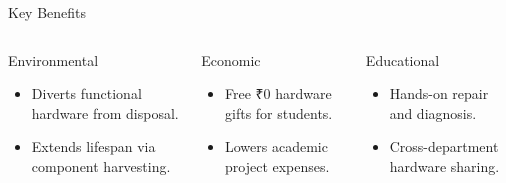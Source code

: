 \documentclass{beamer}
\begin{document}

\begin{frame}{Key Benefits}

\begin{columns}[T]

\begin{block}{Environmental}
\small
\begin{itemize}
    \item Diverts functional hardware from disposal.
    \item Extends lifespan via component harvesting.
\end{itemize}
\end{block}

\begin{block}{Economic}
\small
\begin{itemize}
    \item Free ₹0 hardware gifts for students.
    \item Lowers academic project expenses.
\end{itemize}
\end{block}

\begin{block}{Educational}
\small
\begin{itemize}
    \item Hands-on repair and diagnosis.
    \item Cross-department hardware sharing.
\end{itemize}
\end{block}

\end{columns}

\end{frame}

\end{document}
